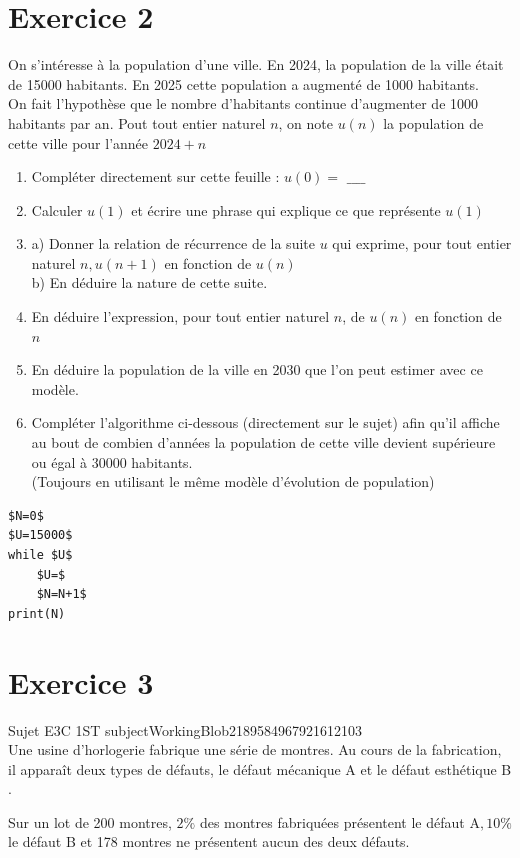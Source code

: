 \documentclass[10pt]{article}
\begin{document}
\section*{Exercice 2}
On s'intéresse à la population d'une ville. En 2024, la population de la ville était de 15000 habitants. En 2025 cette population a augmenté de 1000 habitants.\\
On fait l'hypothèse que le nombre d'habitants continue d'augmenter de 1000 habitants par an. Pout tout entier naturel $n$, on note $u(n)$ la population de cette ville pour l'année $2024+n$

\begin{enumerate}
  \item Compléter directement sur cette feuille : $u(0)=$ $\_\_\_\_$
  \item Calculer $u(1)$ et écrire une phrase qui explique ce que représente $u(1)$
  \item a) Donner la relation de récurrence de la suite $u$ qui exprime, pour tout entier naturel $n, u(n+1)$ en fonction de $u(n)$\\
b) En déduire la nature de cette suite.
  \item En déduire l'expression, pour tout entier naturel $n$, de $u(n)$ en fonction de $n$
  \item En déduire la population de la ville en 2030 que l'on peut estimer avec ce modèle.
  \item Compléter l'algorithme ci-dessous (directement sur le sujet) afin qu'il affiche au bout de combien d'années la population de cette ville devient supérieure ou égal à 30000 habitants.\\
(Toujours en utilisant le même modèle d'évolution de population)
\end{enumerate}

\begin{verbatim}
$N=0$
$U=15000$
while $U$
    $U=$
    $N=N+1$
print(N)
\end{verbatim}

\section*{Exercice 3}
Sujet E3C 1ST subjectWorkingBlob2189584967921612103\\
Une usine d'horlogerie fabrique une série de montres. Au cours de la fabrication, il apparaît deux types de défauts, le défaut mécanique A et le défaut esthétique B .

Sur un lot de 200 montres, $2 \%$ des montres fabriquées présentent le défaut $\mathrm{A}, 10 \%$ le défaut B et 178 montres ne présentent aucun des deux défauts.
\end{document}
